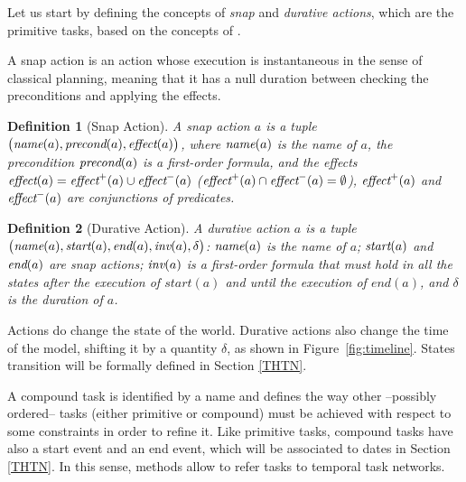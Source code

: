 \documentclass[letterpaper]{article} %
\newtheorem{definition}{Definition}
\newcommand{\name}{\text{\it name}}
\newcommand{\pre}{\text{\it precond}}
\newcommand{\effect}{\text{\it effect}}
\newcommand{\add}{\text{\it effect}^{+}}
\newcommand{\del}{\text{\it effect}^{-}}
\newcommand{\tstart}{\text{\it start}}
\newcommand{\tend}{\text{\it end}}
\newcommand{\tinv}{\text{\it inv}}
\begin{document}
 Let us start by defining the concepts of {\it snap} and {\it durative actions}, which are the primitive tasks, based on the concepts of \cite{abdulaziz22}.

 A snap action is an action whose execution is instantaneous in the sense of classical planning, meaning that it has a null duration %
 between checking the preconditions and applying the effects. %
 \begin{definition}[Snap Action]\label{def:snap} A \emph{snap action} $a$ is a tuple $\bigl(\name(a), \pre(a), \effect(a) \bigr)$, where $\name(a)$ is the name of $a$, the precondition $\pre(a)$ is a first-order formula, %
   and the effects $\effect(a) = \add(a) \cup \del(a)$ ($\add(a) \cap \del(a) = \emptyset$), $\add(a)$ and $\del(a)$ are conjunctions of predicates. 

\end{definition}

\begin{definition}[Durative Action]\label{def:dur}
  A \emph{durative action} $a$ is a tuple $\bigl(\name(a), \tstart(a), \tend(a), \tinv(a), \delta\bigr)$: $\name(a)$ is the name of $a$; $\tstart(a)$ and $\tend(a)$ are snap actions; $\tinv(a)$ is a first-order formula that must hold in all the states after the execution of $start(a)$ and until the execution of $end(a)$, %
  and $\delta$ is the duration of $a$. %
\end{definition}
Actions do change the state of the world. Durative actions also change the time of the model, shifting it by a quantity $\delta$, as shown in Figure~\ref{fig:timeline}.
States transition will be formally defined in Section \ref{THTN}.  %

A compound task is identified by a name and defines the way other --possibly ordered-- tasks (either primitive or compound) must be achieved with respect to some constraints in order to refine it.
 Like primitive tasks, compound tasks have also a start event and an end event, which will be associated to dates in Section \ref{THTN}. %
In this sense, methods allow to refer tasks to temporal task networks.
\end{document}
